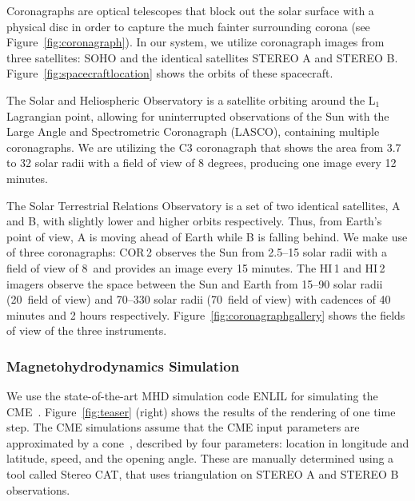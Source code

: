 \documentclass[journal]{vgtc}                %
\begin{document}
Coronagraphs are optical telescopes that block out the solar surface with a physical disc in order to capture the much fainter surrounding corona (see Figure~\ref{fig:coronagraph}). In our system, we utilize coronagraph images from three satellites: SOHO and the identical satellites STEREO A and STEREO B. Figure~\ref{fig:spacecraftlocation} shows the orbits of these spacecraft.

 The Solar and Heliospheric Observatory is a satellite orbiting around the L$_1$ Lagrangian point, allowing for uninterrupted observations of the Sun with the Large Angle and Spectrometric Coronagraph (LASCO), containing multiple coronagraphs. We are utilizing the C3 coronagraph that shows the area from 3.7 to 32 solar radii with a field of view of 8 degrees, producing one image every 12 minutes. 


 The Solar Terrestrial Relations Observatory is a set of two identical satellites, A and B, with slightly lower and higher orbits respectively. Thus, from Earth's point of view, A is moving ahead of Earth while B is falling behind. We make use of three coronagraphs: COR\,2 observes the Sun from 2.5--15 solar radii with a field of view of 8\degree\ and provides an image every 15 minutes. The HI\,1 and HI\,2 imagers observe the space between the Sun and Earth from 15--90 solar radii (20\degree\ field of view) and 70--330 solar radii (70\degree\ field of view) with cadences of 40 minutes and 2 hours respectively. Figure~\ref{fig:coronagraphgallery} shows the fields of view of the three instruments.

\subsubsection{Magnetohydrodynamics Simulation} \label{sec:mhd}
We use the state-of-the-art MHD simulation code ENLIL for simulating the CME~\cite{odstrcil2002merging}. Figure~\ref{fig:teaser} (right) shows the results of the rendering of one time step. The CME simulations assume that the CME input parameters are approximated by a cone~\cite{Arge:2000jz}, described by four parameters: location in longitude and latitude, speed, and the opening angle. These are manually determined using a tool called Stereo CAT, that uses triangulation on STEREO A and STEREO B observations.
\end{document}
